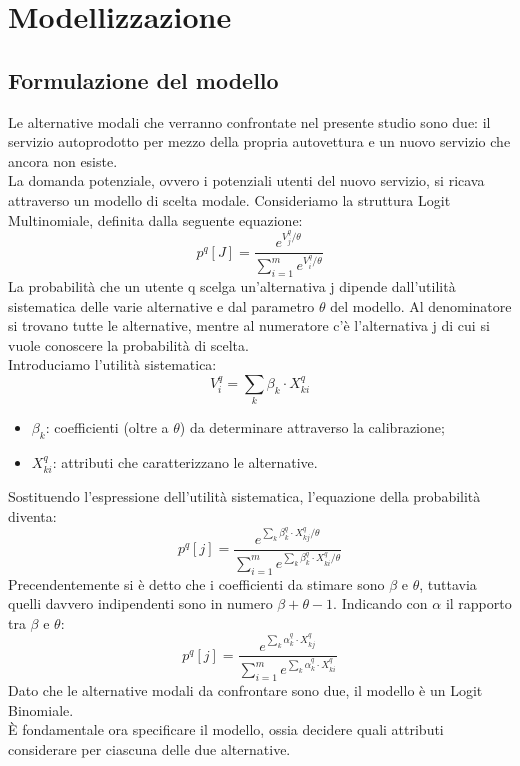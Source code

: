 \documentclass{article}
\begin{document}
\section{Modellizzazione}
\subsection{Formulazione del modello}
Le alternative modali che verranno confrontate nel presente studio sono due: il servizio autoprodotto per mezzo della propria autovettura e un nuovo servizio che ancora non esiste.\\
La domanda potenziale, ovvero i potenziali utenti del nuovo servizio, si ricava attraverso un modello di scelta modale. Consideriamo la struttura Logit Multinomiale, definita dalla seguente equazione:
\begin{equation}
p^{q}[J]=\frac{e^{V^{q}_{j}/\theta}}{\sum^{m}_{i=1}e^{V^{q}_{i}/\theta}}
\end{equation}
La probabilità che un utente q scelga un’alternativa j dipende dall’utilità sistematica delle varie alternative e dal parametro $\theta$ del modello. Al denominatore si trovano tutte le alternative, mentre al numeratore c’è l’alternativa j di cui si vuole conoscere la probabilità di scelta.\\
Introduciamo l’utilità sistematica:
\begin{equation}
V^{q}_{i}=\sum_{k}\beta_{k}\cdot X^{q}_{ki}
\end{equation}
\begin{itemize}
\item$\beta_{k}$: coefficienti (oltre a $\theta$) da determinare attraverso la calibrazione;
\item$X^{q}_{ki}$: attributi che caratterizzano le alternative.
\end{itemize}
Sostituendo l’espressione dell’utilità sistematica, l’equazione della probabilità diventa:
\begin{equation}
p^{q}[j]=\frac{e^{\sum_{k}\beta^{q}_{k}\cdot X^{q}_{kj}/\theta}}{\sum^{m}_{i=1}e^{\sum_{k}\beta_{k}^{q}\cdot X^{q}_{ki}/\theta}}
\end{equation}
Precendentemente si è detto che i coefficienti da stimare sono $\beta$ e $\theta$, tuttavia quelli davvero indipendenti sono in numero $\beta+\theta-1$. Indicando con $\alpha$ il rapporto tra $\beta$ e $\theta$:
\begin{equation}
p^{q}[j]=\frac{e^{\sum_{k}\alpha^{q}_{k}\cdot X^{q}_{kj}}}{\sum^{m}_{i=1}e^{\sum_{k}\alpha_{k}^{q}\cdot X^{q}_{ki}}}
\label{equation}
\end{equation}
Dato che le alternative modali da confrontare sono due, il modello è un Logit Binomiale.\\
È fondamentale ora specificare il modello, ossia decidere quali attributi considerare per ciascuna delle due alternative.
\end{document}
